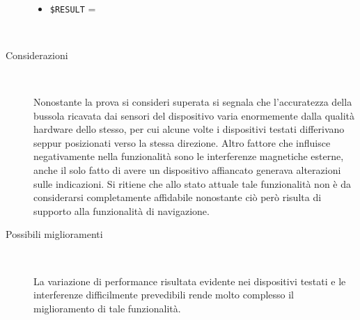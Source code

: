 \documentclass[../../SperimentazioniPratiche.tex]{subfiles}
\begin{document}
\begin{tcolorbox}[fonttitle=\bfseries, 
								adjusted title={\Large Prova 16B.1}, 
								breakable, 
								sharp corners=south,
								colback=white, 
								colframe=white!60!black]
\begin{description}[leftmargin=0.7cm,labelwidth=!]
\begin{description}
        					\item[\dispositivoC] \ \par
        					\begin{itemize}
        						\item \verb|$RESULT| = \ok
        					\end{itemize}
        					
        				\end{description}
        				
        			\tcbline
        			
        			\item[Analisi risultati] \ \par
        				\begin{description}
        					\item[Considerazioni] \ \par
        						Nonostante la prova si consideri superata si segnala che l'accuratezza della bussola ricavata dai sensori del dispositivo varia enormemente dalla qualità hardware dello stesso, per cui alcune volte i dispositivi testati differivano seppur posizionati verso la stessa direzione. Altro fattore che influisce negativamente nella funzionalità sono le interferenze magnetiche esterne, anche il solo fatto di avere un dispositivo affiancato generava alterazioni sulle indicazioni. Si ritiene che allo stato attuale tale funzionalità non è da considerarsi completamente affidabile nonostante ciò però risulta di supporto alla funzionalità di navigazione.
        						
        					\item[Possibili miglioramenti] \ \par 
        						La variazione di performance risultata evidente nei dispositivi testati e le interferenze difficilmente prevedibili rende molto complesso il miglioramento di tale funzionalità. 
        				\end{description}
        				
				\end{description}  
				
			\end{tcolorbox}
	
	
\end{document}
